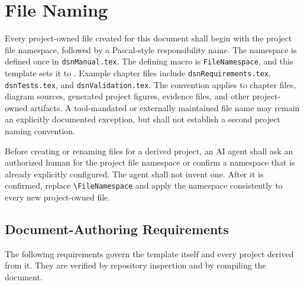 \section{File Naming}

Every project-owned file created for this document shall begin with the project
file namespace, followed by a Pascal-style responsibility name. The namespace
is defined once in \texttt{dsnManual.tex}. The defining macro is
\texttt{FileNamespace}, and this template sets it to
\texttt{\FileNamespace}. Example chapter files include
\texttt{dsnRequirements.tex}, \texttt{dsnTests.tex}, and
\texttt{dsnValidation.tex}. The convention applies to chapter files, diagram
sources, generated project figures, evidence files, and other project-owned
artifacts. A tool-mandated or externally maintained file name may remain an
explicitly documented exception, but shall not establish a second project
naming convention.

Before creating or renaming files for a derived project, an AI agent shall ask
an authorized human for the project file namespace or confirm a namespace that
is already explicitly configured. The agent shall not invent one. After it is
confirmed, replace \verb|\FileNamespace| and apply the namespace consistently
to every new project-owned file.

\subsection{Document-Authoring Requirements}
The following requirements govern the template itself and every project derived
from it. They are verified by repository inspection and by compiling the
document.

